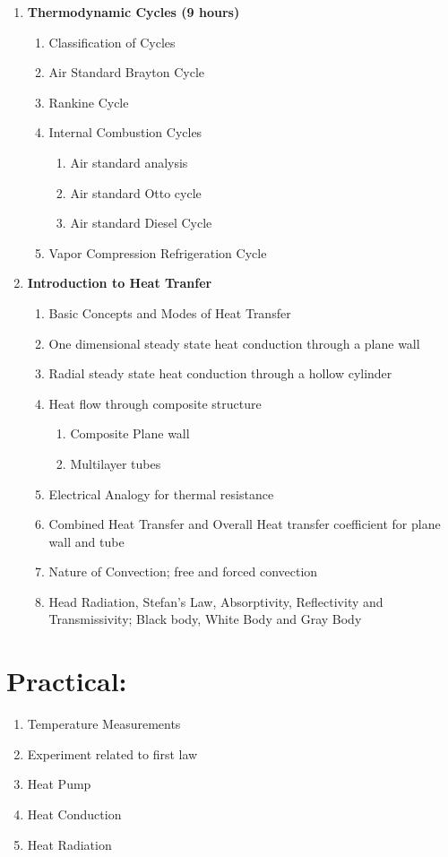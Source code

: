 \begin{enumerate}
    \item \textbf{Thermodynamic Cycles \hfill (9 hours)}
    \begin{enumerate}
        \item Classification of Cycles
        \item Air Standard Brayton Cycle
        \item Rankine Cycle
        \item Internal Combustion Cycles
        \begin{enumerate}
            \item Air standard analysis
            \item Air standard Otto cycle
            \item Air standard Diesel Cycle
        \end{enumerate}
        \item Vapor Compression Refrigeration Cycle
    \end{enumerate}
    
    \item \textbf{Introduction to Heat Tranfer}
    \begin{enumerate}
        \item Basic Concepts and Modes of Heat Transfer
        \item One dimensional steady state heat conduction through a plane wall
        \item Radial steady state heat conduction through a hollow cylinder
        \item Heat flow through composite structure
        \begin{enumerate}
            \item Composite Plane wall
            \item Multilayer tubes
        \end{enumerate}
        \item Electrical Analogy for thermal resistance
        \item Combined Heat Transfer and Overall Heat transfer coefficient for plane wall and tube
        \item Nature of Convection; free and forced convection
        \item Head Radiation, Stefan's Law, Absorptivity, Reflectivity and Transmissivity; Black body, White Body and Gray Body
    \end{enumerate}
\end{enumerate}


\section*{Practical:}
\begin{enumerate}
    \item Temperature Measurements
    \item Experiment related to first law
    \item Heat Pump
    \item Heat Conduction 
    \item Heat Radiation
\end{enumerate}

